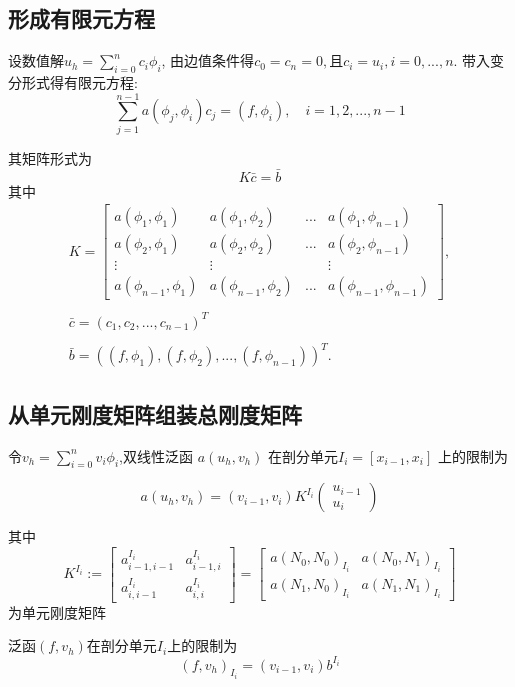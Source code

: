 \documentclass[UTF8,titlepage,twocolumn]{ctexart}
\begin{document}
\subsection{形成有限元方程}

设数值解$u_h = \sum_{i=0}^n c_i \phi_i $, 由边值条件得$c_0 = c_n = 0, \mbox{且}c_i = u_i, i=0,...,n$.
带入变分形式得有限元方程:
$$
\sum_{j=1}^{n-1} a(\phi_j, \phi_i) c_j = (f, \phi_i), \quad i = 1, 2, ... , n-1
$$
\par 
其矩阵形式为
$$ K \bar{c} = \bar{b} $$
其中
$$
\begin{matrix}
K = \begin{bmatrix}
		a(\phi_1,\phi_1) & a(\phi_1,\phi_2) & ... & a(\phi_1,\phi_{n-1}) \\
		a(\phi_2,\phi_1) & a(\phi_2,\phi_2) & ... & a(\phi_2,\phi_{n-1}) \\
		\vdots           & \vdots           &     & \vdots  			 \\
		a(\phi_{n-1},\phi_1) & a(\phi_{n-1},\phi_2) & ... & a(\phi_{n-1},\phi_{n-1})
	\end{bmatrix}, \\ \\
\bar{c} = (c_1, c_2, ... , c_{n-1})^T \\ \\
\bar{b} = ((f,\phi_1), (f,\phi_2), ... , (f,\phi_{n-1}))^T.
\end{matrix}
$$

\subsection{从单元刚度矩阵组装总刚度矩阵}
令$ v_h = \sum_{i=0}^{n} v_i \phi_i $,双线性泛函 $a(u_h,v_h)$ 在剖分单元$ I_i = [x_{i-1},x_i] $ 上的限制为

$$
	a(u_h,v_h) = (v_{i-1},v_i) K^{I_i} 
	\begin{pmatrix}
		u_{i-1} \\
		u_i
	\end{pmatrix}
$$

其中
$$
K^{I_i}:= \begin{bmatrix}
		  		a_{i-1,i-1}^{I_i} & a_{i-1,i}^{I_i} \\
		  		a_{i,i-1}^{I_i}   & a_{i,i}^{I_i}
		  \end{bmatrix} =
	  \begin{bmatrix}
	  	a(N_0,N_0)_{I_i} & a(N_0,N_1)_{I_i} \\
	  	a(N_1,N_0)_{I_i} & a(N_1,N_1)_{I_i}
	  \end{bmatrix}
$$
为单元刚度矩阵
\\ \par
泛函$(f,v_h)$在剖分单元$I_i$上的限制为
$$
	(f,v_h)_{I_i} = (v_{i-1},v_i) b^{I_i}
$$
\end{document}
